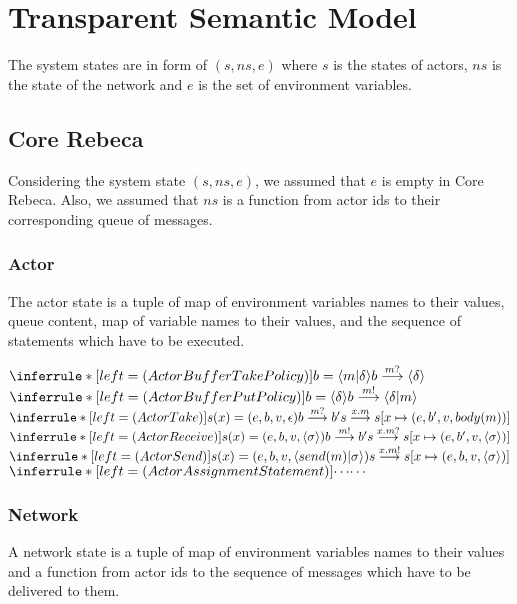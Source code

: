 \section{Transparent Semantic Model}\label{sec::generic}
The system states are in form of $(s, ns, e)$ where $s$ is the states of actors, $ns$ is the state of the network and $e$ is the set of environment variables.
\subsection{Core Rebeca}
Considering the system state $(s, ns, e)$, we assumed that $e$ is empty in Core Rebeca. Also, we assumed that $ns$ is a function from actor ids to their corresponding queue of messages.
\subsubsection{Actor}
The actor state is a tuple of map of environment variables names to their values, queue content, map of variable names to their values, and the sequence of statements which have to be executed.

\noindent
$\inferrule*[left = (Actor Buffer Take Policy)]{b=\langle m | \delta\rangle}{b \overset{m?}{\longrightarrow}\langle\delta\rangle}$\\
$\inferrule*[left = (Actor Buffer Put Policy)]{b=\langle\delta\rangle}{b \overset{ m!}{\longrightarrow}\langle \delta|m\rangle}$\\
$\inferrule*[left = (Actor Take)]{s(x)=(e, b, v, \epsilon) \\ b \overset{m?}{\longrightarrow} b'}{s \overset{x.m}{\longrightarrow}s[x \mapsto (e, b', v, body(m))]}$\\
$\inferrule*[left = (Actor Receive)]{s(x)=(e, b, v, \langle \sigma \rangle) \\ b \overset{m!}{\longrightarrow} b'}{s \overset{x.m?}{\longrightarrow}s[x \mapsto (e, b', v, \langle \sigma \rangle)]}$\\
$\inferrule*[left = (Actor Send)]{s(x)=(e, b, v, \langle send(m)| \sigma \rangle)}{s \overset{x.m!}{\longrightarrow}s[x \mapsto (e, b, v, \langle \sigma\rangle)]}$\\
$\inferrule*[left = (Actor Assignment Statement)]{\cdots}{\cdots}$\\


\subsubsection{Network}
A network state is a tuple of map of environment variables names to their values and a function from actor ids to the sequence of messages which have to be delivered to them.

